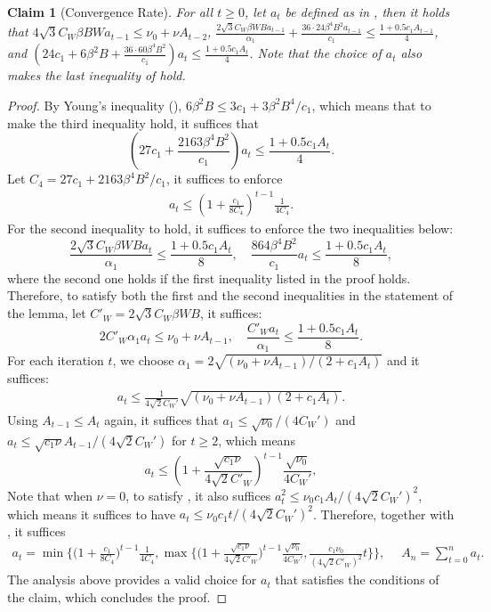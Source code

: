 \documentclass[11pt]{article}
\newcounter{thm}
\numberwithin{thm}{section}
\theoremstyle{plain}
\newtheorem{claim}[thm]{Claim}
\theoremstyle{definition}
\theoremstyle{remark} \newtheorem{remark}[thm]{Remark}
\begin{document}
\begin{claim}[Convergence Rate]\label{lemma:convergence-rate} For all \(t\ge 0\), let \(a_t\) be defined as in , then it holds that \(4\sqrt{3}C_W\beta BWa_{t-1}\leq \nu_0+\nu A_{t-2}\), \(\frac{2\sqrt{3}C_W\beta WBa_{t-1}}{\alpha_1}+\frac{36\cdot24\beta^4B^2a_{t-1}}{c_1}\leq \frac{1+0.5c_1A_{t-1}}{4}\), and \((24c_1+6\beta^2B+\frac{36\cdot 60\beta^4B^2}{c_1})a_t\leq \frac{1+0.5c_1A_t}{4}\). Note that the choice of \(a_t\) also makes the last inequality of  hold.
\end{claim}
\begin{proof}
    By Young's inequality (), \(6\beta^2B \leq 3c_1+3\beta^2B^4/c_1\), which means that to make the third inequality hold, it suffices that
    \[
        (27c_1+\frac{2163\beta^4B^2}{c_1})a_t\leq \frac{1+0.5c_1A_t}{4}.
    \]Let \(C_4=27c_1+2163\beta^4B^2/c_1\), it suffices to enforce
    \begin{align}\label{eq:a_t1}
         a_t\le(1+\frac{c_1}{8C_4})^{t-1}\frac{1}{4C_4}.
    \end{align}
    For the second inequality to hold, it suffices to enforce the two inequalities below:
    \[
        \frac{2\sqrt{3}C_W\beta WBa_t}{\alpha_1}\le \frac{1+0.5c_1A_t}{8}, \quad \frac{864\beta^4B^2}{c_1}a_t\le \frac{1+0.5c_1A_{t}}{8},
    \] where the second one holds if the first inequality listed in the proof holds. Therefore, to satisfy both the first and the second inequalities in the statement of the lemma,
    let \(C'_W=2\sqrt{3}C_W\beta WB\), it suffices:
    \[
        2C'_W\alpha_1 a_t\le \nu_0+\nu A_{t-1} , \quad \frac{C'_W a_t}{\alpha_1}\le \frac{1+0.5c_1A_t}{8}.
    \]
    For each iteration \(t\), we choose \(\alpha_1=2\sqrt{(\nu_0+\nu A_{t-1})/(2+c_1A_t)}\)
    and it suffices:
    \begin{align}\label{eq:a_t2}
         a_t\le \frac{1}{4\sqrt{2}C_W'}\sqrt{(\nu_0+\nu A_{t-1})(2+c_1A_t)}.
    \end{align}
    Using \(A_{t-1}\le A_t\) again, it suffices that \(a_1\le \sqrt{\nu_0}/(4C_W')\) and \(a_t \le \sqrt{c_1\nu}A_{t-1}/(4\sqrt{2}C_W')\) for \(t\ge 2\), which means
    \[
        a_t\le (1+\frac{\sqrt{c_1\nu}}{4\sqrt{2}C'_W})^{t-1}\frac{\sqrt{\nu_0}}{4C_W'},
    \]	
    Note that when \(\nu=0\), to satisfy , it also suffices  \(a_t^2\le \nu_0c_1A_t/(4\sqrt{2}C_W')^2\), which means it suffices to have \(a_t \le \nu_0c_1t/(4\sqrt{2}C_W')^2\). Therefore, together with , it suffices
    \begin{align*}
        a_t= \min\Big\{\Big(1+\frac{c_1}{8C_4})^{t-1}\frac{1}{4C_4},\max\Big\{\Big(1+\frac{\sqrt{c_1\nu}}{4\sqrt{2}C'_W}\Big)^{t-1}\frac{\sqrt{\nu_0}}{4C_W'},\frac{c_1\nu_0}{(4\sqrt{2}C'_W)^2}t\Big\}\Big\}, \quad\;A_n=\sum_{t=0}^na_t.
    \end{align*}
    The analysis above provides a valid choice for \(a_t\) that satisfies the conditions of the claim, which concludes the proof.
\end{proof}   
\end{document}
